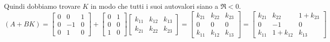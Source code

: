 \begin{Exercise}[title={Studio completo del sistema e stabilizzazione}, difficulty=3]
			Quindi dobbiamo trovare $ K $ in modo che tutti i suoi autovalori siano a $ \Re < 0 $.
			\[
				(A+BK) =
				\begin{bmatrix}
					0 & 0 & 1\\
					0 & -1 & 0\\
					0 & 1 & 0
				\end{bmatrix} +
				\begin{bmatrix}
					0 & 1\\
					0 & 0\\
					1 & 0
				\end{bmatrix}
				\begin{bmatrix}
					k_{11} & k_{12} & k_{13}\\
					k_{21} & k_{22} & k_{23}
				\end{bmatrix} =
				\begin{bmatrix}
					k_{21} & k_{22} & k_{23}\\
					0 & 0 & 0\\
					k_{11} & k_{12} & k_{13}
				\end{bmatrix} =
				\begin{bmatrix}
					k_{21} & k_{22} & 1 + k_{23}\\
					0 & -1 & 0\\
					k_{11} & 1 + k_{12} & k_{13}
				\end{bmatrix}
			\]
	\end{Exercise}
